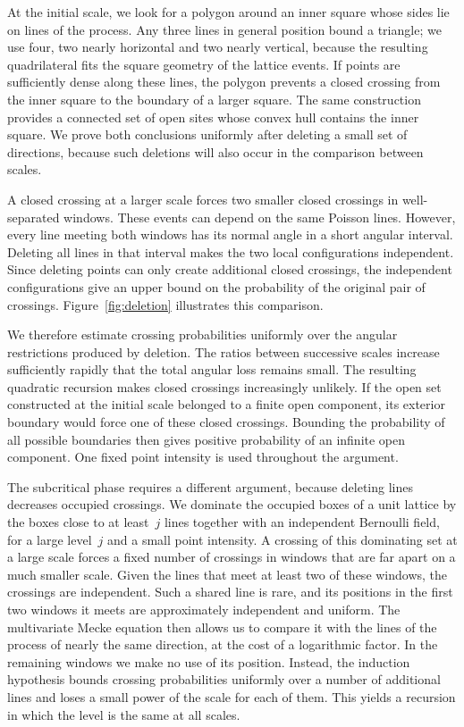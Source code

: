 \documentclass[11pt,letterpaper]{article}
\begin{document}
At the initial scale, we look for a polygon around an inner square whose sides lie on lines of the process. Any three lines in general position bound a triangle; we use four, two nearly horizontal and two nearly vertical, because the resulting quadrilateral fits the square geometry of the lattice events. If points are sufficiently dense along these lines, the polygon prevents a closed crossing from the inner square to the boundary of a larger square. The same construction provides a connected set of open sites whose convex hull contains the inner square. We prove both conclusions uniformly after deleting a small set of directions, because such deletions will also occur in the comparison between scales.

A closed crossing at a larger scale forces two smaller closed crossings in well-separated windows. These events can depend on the same Poisson lines. However, every line meeting both windows has its normal angle in a short angular interval. Deleting all lines in that interval makes the two local configurations independent. Since deleting points can only create additional closed crossings, the independent configurations give an upper bound on the probability of the original pair of crossings. Figure~\ref{fig:deletion} illustrates this comparison.

We therefore estimate crossing probabilities uniformly over the angular restrictions produced by deletion. The ratios between successive scales increase sufficiently rapidly that the total angular loss remains small. The resulting quadratic recursion makes closed crossings increasingly unlikely. If the open set constructed at the initial scale belonged to a finite open component, its exterior boundary would force one of these closed crossings. Bounding the probability of all possible boundaries then gives positive probability of an infinite open component. One fixed point intensity is used throughout the argument.

The subcritical phase requires a different argument, because deleting lines decreases occupied crossings. We dominate the occupied boxes of a unit lattice by the boxes close to at least~$j$ lines together with an independent Bernoulli field, for a large level~$j$ and a small point intensity. A crossing of this dominating set at a large scale forces a fixed number of crossings in windows that are far apart on a much smaller scale. Given the lines that meet at least two of these windows, the crossings are independent. Such a shared line is rare, and its positions in the first two windows it meets are approximately independent and uniform. The multivariate Mecke equation then allows us to compare it with the lines of the process of nearly the same direction, at the cost of a logarithmic factor. In the remaining windows we make no use of its position. Instead, the induction hypothesis bounds crossing probabilities uniformly over a number of additional lines and loses a small power of the scale for each of them. This yields a recursion in which the level is the same at all scales.
\end{document}

